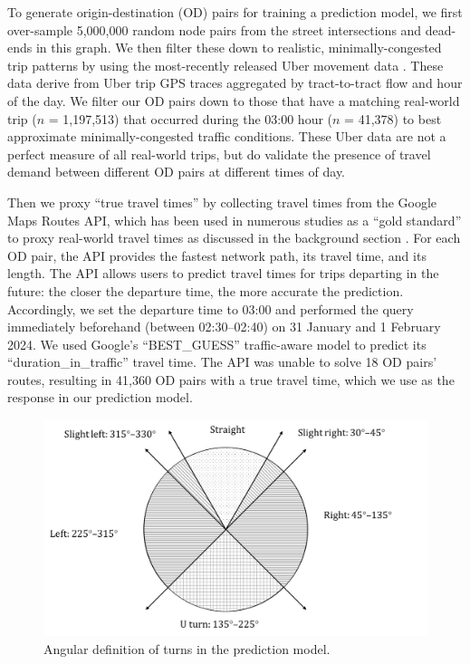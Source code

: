 \documentclass[12pt,letterpaper]{article} %
\begin{document}
To generate origin-destination (OD) pairs for training a prediction model, we first over-sample 5,000,000 random node pairs from the street intersections and dead-ends in this graph. We then filter these down to realistic, minimally-congested trip patterns by using the most-recently released Uber movement data \citep{ubermovement2020}. These data derive from Uber trip GPS traces aggregated by tract-to-tract flow and hour of the day. We filter our OD pairs down to those that have a matching real-world trip ($n$ = 1,197,513) that occurred during the 03:00 hour ($n$ = 41,378) to best approximate minimally-congested traffic conditions. These Uber data are not a perfect measure of all real-world trips, but do validate the presence of travel demand between different OD pairs at different times of day.

Then we proxy \enquote{true travel times} by collecting travel times from the Google Maps Routes API, which has been used in numerous studies as a \enquote{gold standard} to proxy real-world travel times as discussed in the background section \citep[e.g.,][]{ludwig2023traffic, hu2020estimating, wang2011estimating, fu2023comparative, delmelle2019travel}. For each OD pair, the API provides the fastest network path, its travel time, and its length. The API allows users to predict travel times for trips departing in the future: the closer the departure time, the more accurate the prediction. Accordingly, we set the departure time to 03:00 and performed the query immediately beforehand (between 02:30--02:40) on 31 January and 1 February 2024. We used Google's \enquote{BEST\_GUESS} traffic-aware model to predict its \enquote{duration\_in\_traffic} travel time. The API was unable to solve 18 OD pairs' routes, resulting in 41,360 OD pairs with a true travel time, which we use as the response in our prediction model.

\begin{figure}[tb!]
    \centering
    \includegraphics[width=1.0\textwidth]{fig_turns_definition.jpg}
    \caption{Angular definition of turns in the prediction model.}\label{fig:turns_definition}
\end{figure}
\end{document}
